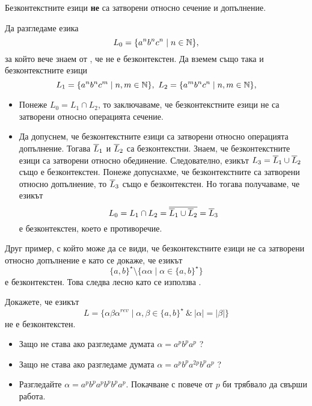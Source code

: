 \begin{framed}
  \begin{prop}
    Безконтекстните езици {\bf не} са затворени относно сечение и допълнение.
  \end{prop}
\end{framed}
\begin{hint}
  Да разгледаме езика
  \[L_0 = \{a^nb^nc^n\mid n\in\mathbb{N}\},\] за който вече знаем от , че не е безконтекстен.
  Да вземем също така и безконтекстните езици 
  \[L_1 = \{a^nb^nc^m\mid n,m\in\mathbb{N}\},\ L_2 = \{a^mb^nc^n\mid n,m\in\mathbb{N}\},\]
  \begin{itemize}
  \item 
    Понеже $L_0 = L_1\cap L_2$, то заключаваме, че безконтекстните езици не са затворени 
    относно операцията сечение.
  \item
    Да допуснем, че безконтекстните езици са затворени относно операцията допълнение.
    Тогава  $\overline{L}_1$ и $\overline{L}_2$ са безконтекстни.
    Знаем, че безконтекстните езици са затворени относно обединение. 
    Следователно, езикът $L_3 = \overline{L}_1 \cup \overline{L}_2$ също е безконтекстен.
    Понеже допуснахме, че безконтекстните са затворени относно допълнение, то $\overline{L}_3$ също е безконтекстен.
    Но тогава получаваме, че езикът
    \[L_0 = L_1 \cap L_2 = \overline{\overline{L}_1 \cup \overline{L}_2} = \overline{L}_3\]
    е безконтекстен, което е противоречие.
  \end{itemize}

  Друг пример, с който може да се види, че безконтекстните езици не са затворени относно допълнение е 
  като се докаже, че езикът
  \[\{a,b\}^\star \setminus \{\alpha\alpha\mid \alpha\in \{a,b\}^\star\}\]
  е безконтекстен.
  Това следва лесно като се използва .
\end{hint}

\begin{problem}
  Докажете, че езикът 
  \[L = \{\alpha\beta\alpha^{rev} \mid \alpha,\beta \in \{a,b\}^\star\ \&\ |\alpha| = |\beta|\}\]
  не е безконтекстен.
\end{problem}
\begin{hint}
  \begin{itemize}
  \item
    Защо не става ако разгледаме думата $\alpha = a^pb^pa^p$ ?
  \item 
    Защо не става ако разгледаме думата $\alpha = a^p b^p a^{2p} b^p a^p$ ?
  \item
    Разгледайте $\alpha = a^p b^p a^p b^p b^p a^p$.
    Покачване с повече от $p$ би трябвало да свърши работа.
  \end{itemize}
\end{hint}


